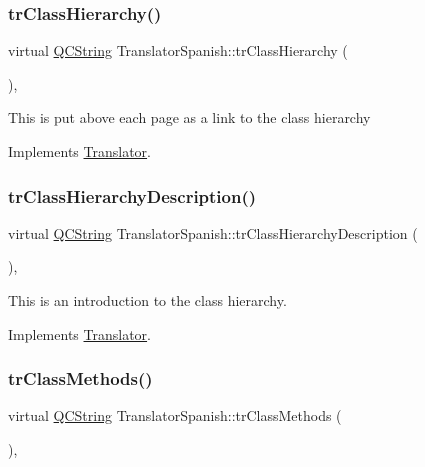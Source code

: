 \subsubsection{\texorpdfstring{trClassHierarchy()}{trClassHierarchy()}}
{\footnotesize\ttfamily virtual \mbox{\hyperlink{class_q_c_string}{Q\+C\+String}} Translator\+Spanish\+::tr\+Class\+Hierarchy (\begin{DoxyParamCaption}{ }\end{DoxyParamCaption})\hspace{0.3cm}{\ttfamily [inline]}, {\ttfamily [virtual]}}

This is put above each page as a link to the class hierarchy 

Implements \mbox{\hyperlink{class_translator}{Translator}}.

\mbox{\label{class_translator_spanish_a03c5ff0879c899c0f966b81669ca58cc}} 
\subsubsection{\texorpdfstring{trClassHierarchyDescription()}{trClassHierarchyDescription()}}
{\footnotesize\ttfamily virtual \mbox{\hyperlink{class_q_c_string}{Q\+C\+String}} Translator\+Spanish\+::tr\+Class\+Hierarchy\+Description (\begin{DoxyParamCaption}{ }\end{DoxyParamCaption})\hspace{0.3cm}{\ttfamily [inline]}, {\ttfamily [virtual]}}

This is an introduction to the class hierarchy. 

Implements \mbox{\hyperlink{class_translator}{Translator}}.

\mbox{\label{class_translator_spanish_a1455bae069fd583ac2c0a8ed022ebbe1}} 
\subsubsection{\texorpdfstring{trClassMethods()}{trClassMethods()}}
{\footnotesize\ttfamily virtual \mbox{\hyperlink{class_q_c_string}{Q\+C\+String}} Translator\+Spanish\+::tr\+Class\+Methods (\begin{DoxyParamCaption}{ }\end{DoxyParamCaption})\hspace{0.3cm}{\ttfamily [inline]}, {\ttfamily [virtual]}}

